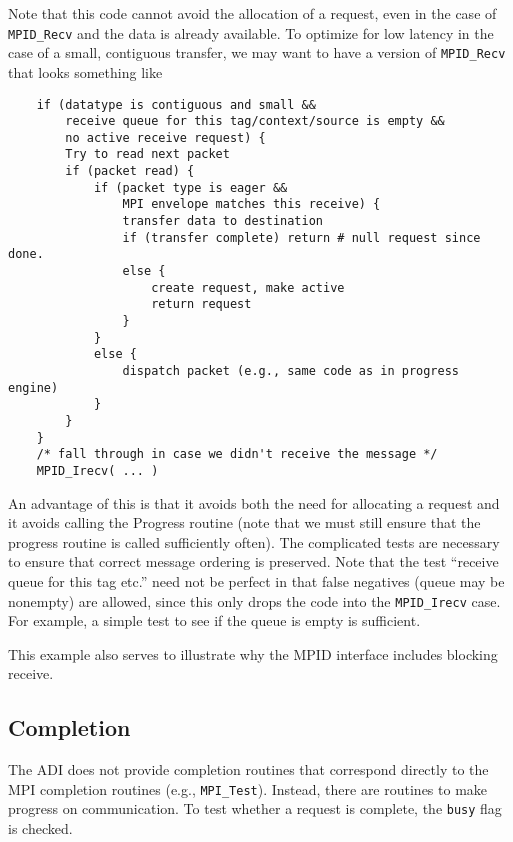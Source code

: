 \documentclass{article}
\def\mpids#1#2{\code{#2}\index{#1!#2}}
\def\code#1{\texttt{#1}}
\begin{document}
Note that this code cannot avoid the allocation of a request, even in
the case of \code{MPID_Recv} and the data is already available.  To
optimize for low latency in the case of a small, contiguous transfer,
we may want to have a version of \code{MPID_Recv} that looks something
like
\begin{verbatim}
    if (datatype is contiguous and small &&
        receive queue for this tag/context/source is empty &&
        no active receive request) {
        Try to read next packet
        if (packet read) {
            if (packet type is eager &&
                MPI envelope matches this receive) {
                transfer data to destination
                if (transfer complete) return # null request since done.
                else {
                    create request, make active
                    return request
                }
            }
            else {
                dispatch packet (e.g., same code as in progress engine)
            }
        } 
    }
    /* fall through in case we didn't receive the message */
    MPID_Irecv( ... )
\end{verbatim}
An advantage of this is that it avoids both the need for allocating a
request and it avoids calling the Progress routine (note that we must
still ensure that the progress routine is called sufficiently often).
The complicated tests are necessary to ensure that correct message
ordering is preserved. Note that the test ``receive queue for this tag
etc.'' need not be perfect in that false negatives (queue may be
nonempty) are allowed, since this only drops the code into the
\code{MPID_Irecv} case.  For example, a simple test to see if the
queue is empty is sufficient.

This example also serves to illustrate why the MPID interface includes
blocking receive.

\subsection{Completion}
The ADI does not provide completion routines that correspond directly
to the MPI completion routines (e.g., \code{MPI_Test}).  Instead,
there are routines to make progress on communication.  To test whether
a request is complete, the \mpids{MPID_Request}{busy} flag is checked.
\end{document}

